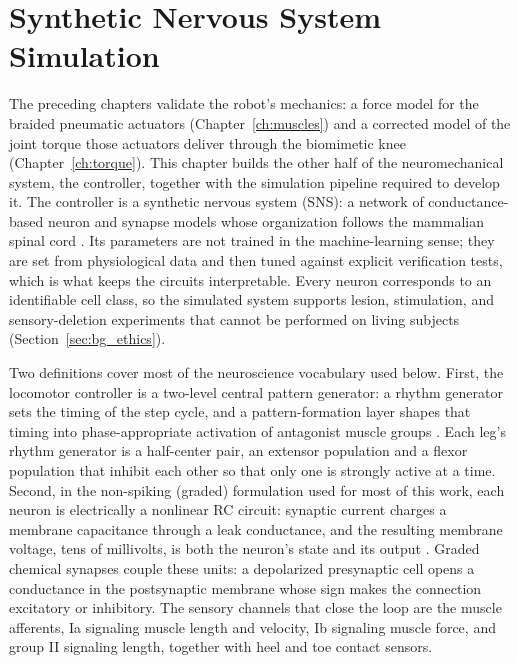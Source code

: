 \chapter{Synthetic Nervous System Simulation}\label{ch:sns}
\graphicspath{{../Figures/60-sns/}{figs/60-sns/}{../Figures/60-sns/AnimatLab_reference/}{figs/60-sns/AnimatLab_reference/}}

The preceding chapters validate the robot's mechanics: a force model for the braided pneumatic actuators (Chapter~\ref{ch:muscles}) and a corrected model of the joint torque those actuators deliver through the biomimetic knee (Chapter~\ref{ch:torque}). This chapter builds the other half of the neuromechanical system, the controller, together with the simulation pipeline required to develop it. The controller is a synthetic nervous system (SNS): a network of conductance-based neuron and synapse models whose organization follows the mammalian spinal cord \citep{rybak_modelling_2006, mccrea_organization_2008, deng_neuromechanical_2019}. Its parameters are not trained in the machine-learning sense; they are set from physiological data and then tuned against explicit verification tests, which is what keeps the circuits interpretable. Every neuron corresponds to an identifiable cell class, so the simulated system supports lesion, stimulation, and sensory-deletion experiments that cannot be performed on living subjects (Section~\ref{sec:bg_ethics}).

Two definitions cover most of the neuroscience vocabulary used below. First, the locomotor controller is a two-level central pattern generator: a rhythm generator sets the timing of the step cycle, and a pattern-formation layer shapes that timing into phase-appropriate activation of antagonist muscle groups \citep{rybak_modelling_2006}. Each leg's rhythm generator is a half-center pair, an extensor population and a flexor population that inhibit each other so that only one is strongly active at a time. Second, in the non-spiking (graded) formulation used for most of this work, each neuron is electrically a nonlinear RC circuit: synaptic current charges a membrane capacitance through a leak conductance, and the resulting membrane voltage, tens of millivolts, is both the neuron's state and its output \citep{nourse_sns_2023}. Graded chemical synapses couple these units: a depolarized presynaptic cell opens a conductance in the postsynaptic membrane whose sign makes the connection excitatory or inhibitory. The sensory channels that close the loop are the muscle afferents, Ia signaling muscle length and velocity, Ib signaling muscle force, and group II signaling length, together with heel and toe contact sensors.

